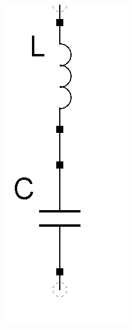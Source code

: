 \begin{frame}
\begin{center}
\begin{figure}
      \includegraphics[width=\textwidth,height=.75\textheight,keepaspectratio]{a04/Schwingkreis_reihe.png}

\end{figure}
\end{center}
\end{frame}
